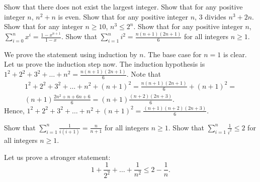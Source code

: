 \begin{chapterendexercises}
  \exercise Show that there does not exist the largest integer.
  \exercise[recommended] Show that for any positive integer $n$, $n^2 + n$ is even.
  \exercise Show that for any positive integer $n$, $3$ divides $n^3 + 2n$.
  \exercise Show that for any integer $n \ge 10$, $n^3 \le 2^n$.
  \exercise Show that for any positive integer $n$,
    $\sum_{i = 0}^n x^i = \frac{1 - x^{n + 1}}{1 - x}$.
  \exercise[recommended] Show that $\sum_{i = 1}^n i^2 = 
    \frac{n (n + 1)(2n + 1)}{6}$ for all integers $n \ge 1$.
    \begin{solution}
      We prove the statement using induction by $n$. The base case for $n = 1$
      is clear. Let us prove the induction step now. The induction hypothesis is
      $1^2 + 2^2 + 3^2 + \dots + n^2 = \frac{n (n + 1)(2n + 1)}{6}$. 
      Note that
      \begin{multline*}
        1^2 + 2^2 + 3^2 + \dots + n^2 + (n + 1)^2 = \frac{n (n + 1)(2n + 1)}{6} +
        (n + 1)^2 = \\
        (n + 1)\frac{2n^2 + n + 6n + 6}{6} = (n + 1)\frac{(n + 2)(2n + 3)}{6}.
      \end{multline*}
      Hence, $1^2 + 2^2 + 3^2 + \dots + n^2 + (n + 1)^2 = 
      \frac{(n + 1)(n + 2)(2n + 3)}{6}$.
    \end{solution}
  \exercise Show that $\sum_{i = 1}^n \frac{1}{i (i + 1)} = 
    \frac{n}{n + 1}$ for all integers $n \ge 1$.
  \exercise Show that $\sum_{i = 1}^n \frac{1}{i^2} \le 2$ for all integers 
    $n \ge 1$.
    \begin{solution}
      Let us prove a stronger statement:
      \[
        1 + \frac{1}{2^2} + \dots + \frac{1}{n^2} \le 2 - \frac{1}{n}.
      \]


\end{solution}
\end{chapterendexercises}
